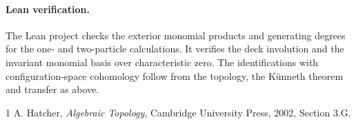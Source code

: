 \documentclass[11pt]{article}
\begin{document}
\paragraph{Lean verification.}
The Lean project checks the exterior monomial products and generating
degrees for the one- and two-particle calculations. It verifies the
deck involution and the invariant monomial basis over characteristic
zero. The identifications with configuration-space cohomology follow
from the topology, the Künneth theorem and transfer as above.

\begin{thebibliography}{1}
A. Hatcher, \emph{Algebraic Topology}, Cambridge University Press,
2002, Section 3.G.
\end{thebibliography}
\end{document}

